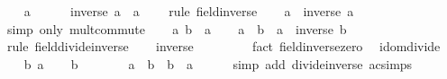 \begin{isabellebody}
\ \ \isamarkupfalse%
\ {\isachardoublequoteopen}a\ {\isasymnoteq}\ {}{\isachardoublequoteclose}\isanewline
\ \ \isamarkupfalse%
\ {\isachardoublequoteopen}inverse\ a\ {\isacharasterisk}{\kern0pt}\ a\ {\isacharequal}{\kern0pt}\ {}{\isachardoublequoteclose}\ \isamarkupfalse%
\ {\isacharparenleft}{\kern0pt}rule\ field{\isacharunderscore}{\kern0pt}inverse{\isacharparenright}{\kern0pt}\isanewline
\ \ \isamarkupfalse%
\ {\isachardoublequoteopen}a\ {\isacharasterisk}{\kern0pt}\ inverse\ a\ {\isacharequal}{\kern0pt}\ {}{\isachardoublequoteclose}\ \isamarkupfalse%
\ {\isacharparenleft}{\kern0pt}simp\ only{\isacharcolon}{\kern0pt}\ mult{\isachardot}{\kern0pt}commute{\isacharparenright}{\kern0pt}\isanewline
{}\isamarkupfalse%
\isanewline
\ \ \isamarkupfalse%
\ a\ b\ {\isacharcolon}{\kern0pt}{\isacharcolon}{\kern0pt}\ {\isacharprime}{\kern0pt}a\isanewline
\ \ \isamarkupfalse%
\ {\isachardoublequoteopen}a\ {\isacharslash}{\kern0pt}\ b\ {\isacharequal}{\kern0pt}\ a\ {\isacharasterisk}{\kern0pt}\ inverse\ b{\isachardoublequoteclose}\ \isamarkupfalse%
\ {\isacharparenleft}{\kern0pt}rule\ field{\isacharunderscore}{\kern0pt}divide{\isacharunderscore}{\kern0pt}inverse{\isacharparenright}{\kern0pt}\isanewline
{}\isamarkupfalse%
\isanewline
\ \ \isamarkupfalse%
\ {\isachardoublequoteopen}inverse\ {}\ {\isacharequal}{\kern0pt}\ {}{\isachardoublequoteclose}\isanewline
\ \ \ \ \isamarkupfalse%
\ {\isacharparenleft}{\kern0pt}fact\ field{\isacharunderscore}{\kern0pt}inverse{\isacharunderscore}{\kern0pt}zero{\isacharparenright}{\kern0pt}\ \isanewline
{}\isamarkupfalse%
%
\endisatagproof
{\isafoldproof}%
%
\isadelimproof
\isanewline
%
\endisadelimproof
\isanewline
{}\isamarkupfalse%
\ idom{\isacharunderscore}{\kern0pt}divide\isanewline
%
\isadelimproof
%
\endisadelimproof
%
\isatagproof
{}\isamarkupfalse%
\isanewline
\ \ \isamarkupfalse%
\ b\ a\isanewline
\ \ \isamarkupfalse%
\ {\isachardoublequoteopen}b\ {\isasymnoteq}\ {}{\isachardoublequoteclose}\isanewline
\ \ \isamarkupfalse%
\ \isamarkupfalse%
\ {\isachardoublequoteopen}a\ {\isacharasterisk}{\kern0pt}\ b\ {\isacharslash}{\kern0pt}\ b\ {\isacharequal}{\kern0pt}\ a{\isachardoublequoteclose}\isanewline
\ \ \ \ \isamarkupfalse%
\ {\isacharparenleft}{\kern0pt}simp\ add{\isacharcolon}{\kern0pt}\ divide{\isacharunderscore}{\kern0pt}inverse\ ac{\isacharunderscore}{\kern0pt}simps{\isacharparenright}{\kern0pt}\isanewline

\end{isabellebody}
